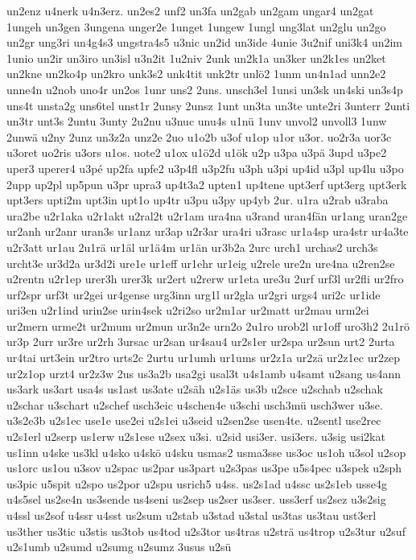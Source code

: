 {un2enz
u4nerk
u4n3erz.
un2es2
unf2
un3fa
un2gab
un2gam
ungar4
un2gat
1ungeh
un3gen
3ungena
unger2e
1unget
1ungew
1ungl
ung3lat
un2glu
un2go
un2gr
ung3ri
un4g4s3
ungstra4s5
u3nic
un2id
un3ide
4unie
3u2nif
uni3k4
un2im
1unio
un2ir
un3iro
un3isl
u3n2it
1u2niv
2unk
un2k1a
un3ker
un2k1es
un2ket
un2kne
un2ko4p
un2kro
unk3s2
unk4tit
unk2tr
unlö2
1unm
un4n1ad
unn2e2
unne4n
u2nob
uno4r
un2os
1unr
uns2
2uns.
unsch3el
1unsi
un3sk
un4ski
un3s4p
uns4t
unsta2g
uns6tel
unst1r
2unsy
2unsz
1unt
un3ta
un3te
unte2ri
3unterr
2unti
un3tr
unt3s
2untu
3unty
2u2nu
u3nuc
unu4s
u1nü
1unv
unvol2
unvoll3
1unw
2unwä
u2ny
2unz
un3z2a
unz2e
2uo
u1o2b
u3of
u1op
u1or
u3or.
uo2r3a
uor3c
u3oret
uo2ris
u3ors
u1os.
uote2
u1ox
u1ö2d
u1ök
u2p
u3pa
u3pä
3upd
u3pe2
uper3
uperer4
u3pé
up2fa
upfe2
u3p4fl
u3p2fu
u3ph
u3pi
up4id
u3pl
up4lu
u3po
2upp
up2pl
up5pun
u3pr
upra3
up4t3a2
upten1
up4tene
upt3erf
upt3erg
upt3erk
upt3ers
upti2m
upt3in
upt1o
up4tr
u3pu
u3py
up4yb
2ur.
u1ra
u2rab
u3raba
ura2be
u2r1aka
u2r1akt
u2ral2t
u2r1am
ura4na
u3rand
uran4fän
ur1ang
uran2ge
ur2anh
ur2anr
uran3s
ur1anz
ur3ap
u2r3ar
ura4ri
u3rasc
ur1a4sp
ura4str
ur4a3te
u2r3att
ur1au
2u1rä
ur1äl
ur1ä4m
ur1än
ur3b2a
2urc
urch1
urchas2
urch3s
urcht3e
ur3d2a
ur3d2i
ure1e
ur1eff
ur1ehr
ur1eig
u2rele
ure2n
ure4na
u2ren2se
u2rentn
u2r1ep
urer3h
urer3k
ur2ert
u2rerw
ur1eta
ure3u
2urf
urf3l
ur2fli
ur2fro
urf2spr
urf3t
ur2gei
ur4gense
urg3inn
urg1l
ur2gla
ur2gri
urgs4
uri2c
ur1ide
uri3en
u2r1ind
urin2se
urin4sek
u2ri2so
ur2m1ar
ur2matt
ur2mau
urm2ei
ur2mern
urme2t
ur2mum
ur2mun
ur3n2e
urn2o
2u1ro
urob2l
ur1off
uro3h2
2u1rö
ur3p
2urr
ur3re
ur2rh
3ursac
ur2san
ur4sau4
ur2s1er
ur2spa
ur2sun
urt2
2urta
ur4tai
urt3ein
ur2tro
urts2c
2urtu
ur1umh
ur1ums
ur2z1a
ur2zä
ur2z1ec
ur2zep
ur2z1op
urzt4
ur2z3w
2us
us3a2b
usa2gi
usal3t
u4s1amb
u4samt
u2sang
us4ann
us3ark
us3art
usa4s
us1ast
us3ate
u2säh
u2s1äs
us3b
u2sce
u2schab
u2schak
u2schar
u3schart
u2schef
usch3eic
u4schen4e
u3schi
usch3mü
usch3wer
u3se.
u3s2e3b
u2s1ec
use1e
use2ei
u2s1ei
u3seid
u2sen2se
usen4te.
u2sentl
use2rec
u2s1erl
u2serp
us1erw
u2s1ese
u2sex
u3si.
u2sid
usi3er.
usi3ers.
u3sig
usi2kat
us1inn
u4ske
us3kl
u4sko
u4skö
u4sku
usmas2
usma3sse
us3oc
us1oh
u3sol
u2sop
us1orc
us1ou
u3sov
u2spac
us2par
us3part
u2s3pas
us3pe
u5s4pec
u3spek
u2sph
us3pic
u5spit
u2spo
us2por
u2spu
usrich5
u4ss.
us2s1ad
u4ssc
us2s1eb
usse4g
u4s5sel
us2se4n
us3sende
us4seni
us2sep
us2ser
us3ser.
uss3erf
us2sez
u3s2sig
u4ssl
us2sof
u4ssr
u4sst
us2sum
u2stab
u3stad
u3stal
us3tas
us3tau
ust3erl
us3ther
us3tic
u3stis
us3tob
us4tod
u2s3tor
us4tras
u2strä
us4trop
u2s3tur
u2suf
u2s1umb
u2sumd
u2sumg
u2sumz
3usus
u2sü
}

